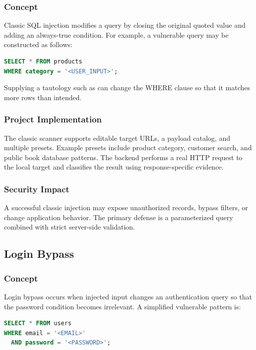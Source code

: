 \documentclass[12pt,a4paper]{article}
\newcommand{\code}[1]{\texttt{\detokenize{#1}}}
\begin{document}
\subsubsection{Concept}

Classic SQL injection modifies a query by closing the original quoted value and adding an always-true condition. For example, a vulnerable query may be constructed as follows:

\begin{lstlisting}[language=SQL,caption={Conceptual vulnerable search query}]
SELECT * FROM products
WHERE category = '<USER_INPUT>';
\end{lstlisting}

Supplying a tautology such as \code{1' OR '1'='1} can change the WHERE clause so that it matches more rows than intended.

\subsubsection{Project Implementation}

The classic scanner supports editable target URLs, a payload catalog, and multiple presets. Example presets include product category, customer search, and public book database patterns. The backend performs a real HTTP request to the local target and classifies the result using response-specific evidence.

\subsubsection{Security Impact}

A successful classic injection may expose unauthorized records, bypass filters, or change application behavior. The primary defense is a parameterized query combined with strict server-side validation.

\subsection{Login Bypass}

\subsubsection{Concept}

Login bypass occurs when injected input changes an authentication query so that the password condition becomes irrelevant. A simplified vulnerable pattern is:

\begin{lstlisting}[language=SQL,caption={Conceptual vulnerable authentication query}]
SELECT * FROM users
WHERE email = '<EMAIL>'
  AND password = '<PASSWORD>';
\end{lstlisting}
\end{document}

